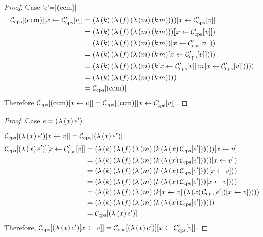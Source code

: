 \begin{proof}{Case \scheme'e'=\scheme|(ccm)|}
\begin{align*}
\mathcal{C}_{\mathrm{cps}}[(\mathrm{ccm})][x\leftarrow \mathcal{C}'_{\mathrm{cps}}[v]] &=(\lambda\,(k)\,(\lambda\,(f)\,(\lambda\,(m)\,(k\,m))))[x\leftarrow \mathcal{C}'_{\mathrm{cps}}[v]]\\
                                   &=(\lambda\,(k)\,(\lambda\,(f)\,(\lambda\,(m)\,(k\,m)))[x\leftarrow \mathcal{C}'_{\mathrm{cps}}[v]])\\
                                   &=(\lambda\,(k)\,(\lambda\,(f)\,(\lambda\,(m)\,(k\,m))[x\leftarrow \mathcal{C}'_{\mathrm{cps}}[v]]))\\
                                   &=(\lambda\,(k)\,(\lambda\,(f)\,(\lambda\,(m)\,(k\,m)[x\leftarrow \mathcal{C}'_{\mathrm{cps}}[v]])))\\
                                   &=(\lambda\,(k)\,(\lambda\,(f)\,(\lambda\,(m)\,(k[x\leftarrow \mathcal{C}'_{\mathrm{cps}}[v]]\,m[x\leftarrow \mathcal{C}'_{\mathrm{cps}}[v]]))))\\
                                   &=(\lambda\,(k)\,(\lambda\,(f)\,(\lambda\,(m)\,(k\,m))))\\
                                   &=\mathcal{C}_{\mathrm{cps}}[(\mathrm{ccm})]
\end{align*}
Therefore $\mathcal{C}_{\mathrm{cps}}[(\mathrm{ccm})[x\leftarrow v]]=\mathcal{C}_{\mathrm{cps}}[(\mathrm{ccm})][x\leftarrow \mathcal{C}'_{\mathrm{cps}}[v]]$.
\end{proof}

\begin{proof}{Case $e=(\lambda\,(x)\,e')$}

$\mathcal{C}_{\mathrm{cps}}[(\lambda\,(x)\,e')[x\leftarrow v]]=\mathcal{C}_{\mathrm{cps}}[(\lambda\,(x)\,e')]$
\begin{align*}
\mathcal{C}_{\mathrm{cps}}[(\lambda\,(x)\,e')][x\leftarrow \mathcal{C}'_{\mathrm{cps}}[v]] &=(\lambda\,(k)\,(\lambda\,(f)\,(\lambda\,(m)\,(k\,(\lambda\,(x)\,\mathcal{C}_{\mathrm{cps}}[e'])))))[x\leftarrow v]\\
                                          &=(\lambda\,(k)\,(\lambda\,(f)\,(\lambda\,(m)\,(k\,(\lambda\,(x)\,\mathcal{C}_{\mathrm{cps}}[e']))))[x\leftarrow v])\\
                                          &=(\lambda\,(k)\,(\lambda\,(f)\,(\lambda\,(m)\,(k\,(\lambda\,(x)\,\mathcal{C}_{\mathrm{cps}}[e'])))[x\leftarrow v]))\\
                                          &=(\lambda\,(k)\,(\lambda\,(f)\,(\lambda\,(m)\,(k\,(\lambda\,(x)\,\mathcal{C}_{\mathrm{cps}}[e']))[x\leftarrow v])))\\
                                          &=(\lambda\,(k)\,(\lambda\,(f)\,(\lambda\,(m)\,(k[x\leftarrow v]\,(\lambda\,(x)\,\mathcal{C}_{\mathrm{cps}}[e'])[x\leftarrow v]))))\\
                                          &=(\lambda\,(k)\,(\lambda\,(f)\,(\lambda\,(m)\,(k\,(\lambda\,(x)\,\mathcal{C}_{\mathrm{cps}}[e'])))))\\
                                          &=\mathcal{C}_{\mathrm{cps}}[(\lambda\,(x)\,e')]
\end{align*}
Therefore, $\mathcal{C}_{\mathrm{cps}}[(\lambda\,(x)\,e')[x\leftarrow v]]=\mathcal{C}_{\mathrm{cps}}[(\lambda\,(x)\,e')][x\leftarrow \mathcal{C}'_{\mathrm{cps}}[v]]$.
\end{proof}

